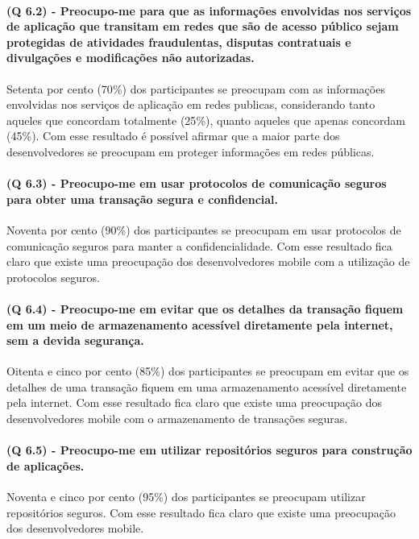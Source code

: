 \paragraph{\textbf{(Q 6.2)} - Preocupo-me para que as informações envolvidas nos serviços de aplicação que transitam em redes que são de acesso público sejam protegidas de atividades fraudulentas, disputas contratuais e divulgações e modificações não autorizadas.}

Setenta por cento (70{\%}) dos participantes se preocupam com as informações envolvidas nos serviços de aplicação em redes publicas, considerando tanto aqueles que concordam totalmente (25{\%}), quanto aqueles que apenas concordam (45{\%}). Com esse resultado é possível afirmar que a maior parte dos desenvolvedores se preocupam em proteger informações em redes públicas.

\paragraph{\textbf{(Q 6.3)} - Preocupo-me em usar protocolos de comunicação seguros para obter uma transação segura e confidencial.}

Noventa por cento (90{\%}) dos participantes se preocupam em usar protocolos de comunicação seguros para manter a confidencialidade. Com esse resultado fica claro que existe uma preocupação dos desenvolvedores mobile com a utilização de protocolos seguros.

\paragraph{\textbf{(Q 6.4)} - Preocupo-me em evitar que os detalhes da transação fiquem em um meio de armazenamento acessível diretamente pela internet, sem a devida segurança.}

Oitenta e cinco por cento (85{\%}) dos participantes se preocupam em evitar que os detalhes de uma transação fiquem em uma armazenamento acessível diretamente pela internet. Com esse resultado fica claro que existe uma preocupação dos desenvolvedores mobile com o armazenamento de transações seguras.

\paragraph{\textbf{(Q 6.5)} - Preocupo-me em utilizar repositórios seguros para construção de aplicações.}

Noventa e cinco por cento (95{\%}) dos participantes se preocupam utilizar repositórios seguros. Com esse resultado fica claro que existe uma preocupação dos desenvolvedores mobile.

